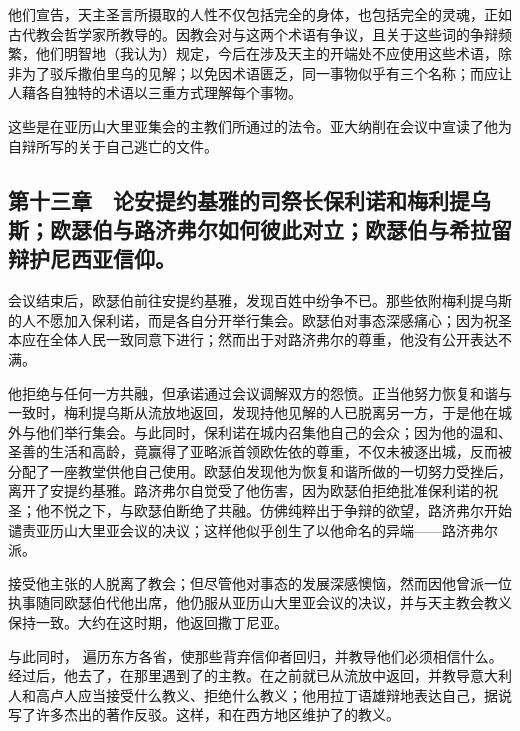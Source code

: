 他们宣告，天主圣言所摄取的人性不仅包括完全的身体，也包括完全的灵魂，正如古代教会哲学家所教导的。因教会对与这两个术语有争议，且关于这些词的争辩频繁，他们明智地（我认为）规定，今后在涉及天主的开端处不应使用这些术语，除非为了驳斥撒伯里乌的见解；以免因术语匮乏，同一事物似乎有三个名称；而应让人藉各自独特的术语以三重方式理解每个事物。\par

这些是在亚历山大里亚集会的主教们所通过的法令。亚大纳削在会议中宣读了他为自辩所写的关于自己逃亡的文件。\par


\subsection{第十三章　论安提约基雅的司祭长保利诺和梅利提乌斯；欧瑟伯与路济弗尔如何彼此对立；欧瑟伯与希拉留辩护尼西亚信仰。}

会议结束后，欧瑟伯前往安提约基雅，发现百姓中纷争不已。那些依附梅利提乌斯的人不愿加入保利诺，而是各自分开举行集会。欧瑟伯对事态深感痛心；因为祝圣本应在全体人民一致同意下进行；然而出于对路济弗尔的尊重，他没有公开表达不满。\par

他拒绝与任何一方共融，但承诺通过会议调解双方的怨愤。正当他努力恢复和谐与一致时，梅利提乌斯从流放地返回，发现持他见解的人已脱离另一方，于是他在城外与他们举行集会。与此同时，保利诺在城内召集他自己的会众；因为他的温和、圣善的生活和高龄，竟赢得了亚略派首领欧佐依的尊重，不仅未被逐出城，反而被分配了一座教堂供他自己使用。欧瑟伯发现他为恢复和谐所做的一切努力受挫后，离开了安提约基雅。路济弗尔自觉受了他伤害，因为欧瑟伯拒绝批准保利诺的祝圣；他不悦之下，与欧瑟伯断绝了共融。仿佛纯粹出于争辩的欲望，路济弗尔开始谴责亚历山大里亚会议的决议；这样他似乎创生了以他命名的异端——路济弗尔派。\par

接受他主张的人脱离了教会；但尽管他对事态的发展深感懊恼，然而因他曾派一位执事随同欧瑟伯代他出席，他仍服从亚历山大里亚会议的决议，并与天主教会教义保持一致。大约在这时期，他返回撒丁尼亚。\par

与此同时，\newline{} 遍历东方各省，使那些背弃信仰者回归，并教导他们必须相信什么。经过后，他去了，在那里遇到了的主教。在之前就已从流放中返回，并教导意大利人和高卢人应当接受什么教义、拒绝什么教义；他用拉丁语雄辩地表达自己，据说写了许多杰出的著作反驳。这样，和在西方地区维护了的教义。\par

